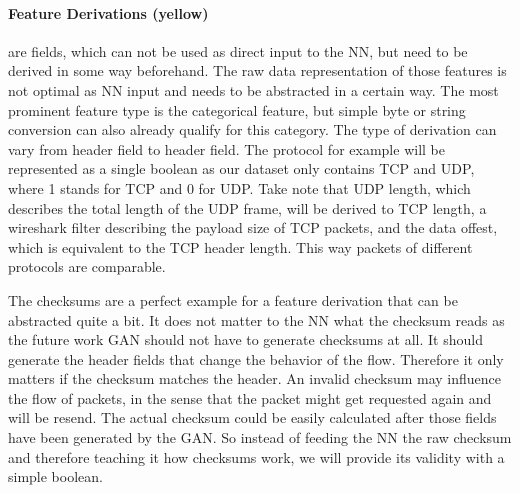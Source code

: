 \documentclass[
	ngerman,
	ruledheaders=section,%
	class=report,%
	thesis={type=bachelor},%
	accentcolor=9c,%
	custommargins=true,%
	marginpar=false,%
	parskip=half-,%
	fontsize=11pt,%
]{tudapub}
\begin{document}
\paragraph{\colorbox{derivation}{\textbf{Feature Derivations} (yellow)}} are fields, which can not be used as direct input to the NN,
but need to be derived in some way beforehand.
The raw data representation of those features is not optimal as NN input and needs to be abstracted in a certain way.
The most prominent feature type is the categorical feature, but simple byte or string conversion can also already qualify for this category.
The type of derivation can vary from header field to header field.
The protocol for example will be represented as a single boolean as our dataset only contains TCP and UDP, where 1 stands for TCP and 0 for UDP.
Take note that UDP length, which describes the total length of the UDP frame, will be derived to TCP length, a wireshark filter describing the payload size of TCP packets, and the data offest, which is equivalent to the TCP header length.
This way packets of different protocols are comparable.

The checksums are a perfect example for a feature derivation that can be abstracted quite a bit.
It does not matter to the NN what the checksum reads as the future work GAN should not have to generate checksums at all.
It should generate the header fields that change the behavior of the flow.
Therefore it only matters if the checksum matches the header.
An invalid checksum may influence the flow of packets, in the sense that the packet might get requested again and will be resend.
The actual checksum could be easily calculated after those fields have been generated by the GAN.
So instead of feeding the NN the raw checksum and therefore teaching it how checksums work, we will provide its validity with a simple boolean.
\end{document}
